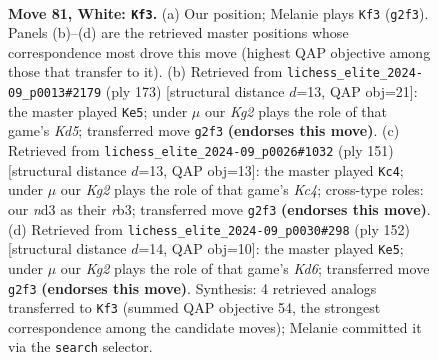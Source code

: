 \documentclass[11pt]{article}
\begin{document}
\clearpage

\begin{figure}[p]\centering
\begin{subfigure}{0.46\textwidth}\centering
\resizebox{\linewidth}{!}{%
\newchessgame
\chessboard[
  setfen={8/R7/4k1pP/5p2/5P2/3n4/p5K1/8 w - - 4 81},
  showmover=false,
  pgfstyle=straightmove, color=movearrow, markmove={g2-f3}
]}
\caption{}
\end{subfigure}\hfill
\begin{subfigure}{0.46\textwidth}\centering
\resizebox{\linewidth}{!}{%
\newchessgame
\chessboard[
  setfen={5N2/8/6p1/P5P1/3k3P/5PK1/8/1r6 b - - 3 87},
  showmover=false,
  pgfstyle=straightmove, color=movearrow, markmove={d4-e5}
]}
\caption{}
\end{subfigure}
\\[4pt]
\begin{subfigure}{0.46\textwidth}\centering
\resizebox{\linewidth}{!}{%
\newchessgame
\chessboard[
  setfen={8/3r4/6p1/2k3P1/4P3/1Rp1K3/8/8 b - - 1 76},
  showmover=false,
  pgfstyle=straightmove, color=movearrow, markmove={c5-c4}
]}
\caption{}
\end{subfigure}\hfill
\begin{subfigure}{0.46\textwidth}\centering
\resizebox{\linewidth}{!}{%
\newchessgame
\chessboard[
  setfen={5R2/8/3K4/p7/P5k1/5p1p/8/8 w - - 0 77},
  showmover=false,
  pgfstyle=straightmove, color=movearrow, markmove={d6-e5}
]}
\caption{}
\end{subfigure}
\caption{\textbf{Move 81, White: \texttt{Kf3}.} (a) Our position; Melanie plays \texttt{Kf3} (\texttt{g2f3}). Panels (b)--(d) are the retrieved master positions whose correspondence most drove this move (highest QAP objective among those that transfer to it). (b) Retrieved from \texttt{lichess\_elite\_2024-09\_p0013\#2179} (ply 173) [structural distance $d$=13, QAP obj=21]: the master played \texttt{Ke5}; under $\mu$ our \emph{Kg2} plays the role of that game's \emph{Kd5}; transferred move \texttt{g2f3} \textbf{(endorses this move)}. (c) Retrieved from \texttt{lichess\_elite\_2024-09\_p0026\#1032} (ply 151) [structural distance $d$=13, QAP obj=13]: the master played \texttt{Kc4}; under $\mu$ our \emph{Kg2} plays the role of that game's \emph{Kc4}; cross-type roles: our \emph{n}d3 as their \emph{r}b3; transferred move \texttt{g2f3} \textbf{(endorses this move)}. (d) Retrieved from \texttt{lichess\_elite\_2024-09\_p0030\#298} (ply 152) [structural distance $d$=14, QAP obj=10]: the master played \texttt{Ke5}; under $\mu$ our \emph{Kg2} plays the role of that game's \emph{Kd6}; transferred move \texttt{g2f3} \textbf{(endorses this move)}. Synthesis: 4 retrieved analogs transferred to \texttt{Kf3} (summed QAP objective 54, the strongest correspondence among the candidate moves); Melanie committed it via the \texttt{search} selector.}
\label{fig:thought-m160}
\end{figure}
\end{document}
